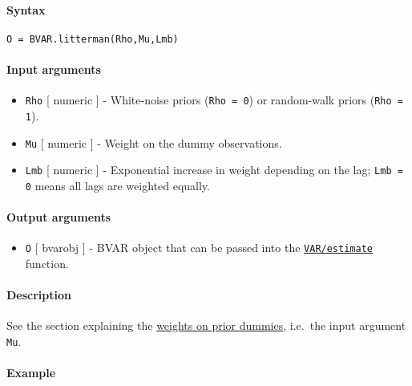 


	\paragraph{Syntax}\label{syntax}

\begin{verbatim}
O = BVAR.litterman(Rho,Mu,Lmb)
\end{verbatim}

\paragraph{Input arguments}\label{input-arguments}

\begin{itemize}
\item
  \texttt{Rho} {[} numeric {]} - White-noise priors (\texttt{Rho = 0})
  or random-walk priors (\texttt{Rho = 1}).
\item
  \texttt{Mu} {[} numeric {]} - Weight on the dummy observations.
\item
  \texttt{Lmb} {[} numeric {]} - Exponential increase in weight
  depending on the lag; \texttt{Lmb = 0} means all lags are weighted
  equally.
\end{itemize}

\paragraph{Output arguments}\label{output-arguments}

\begin{itemize}
\itemsep1pt\parskip0pt
\item
  \texttt{O} {[} bvarobj {]} - BVAR object that can be passed into the
  \href{VAR/estimate}{\texttt{VAR/estimate}} function.
\end{itemize}

\paragraph{Description}\label{description}

See the section explaining the \href{BVAR/Contents}{weights on prior
dummies}, i.e.~the input argument \texttt{Mu}.

\paragraph{Example}\label{example}


